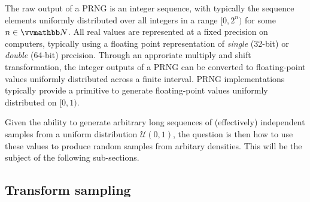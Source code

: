 The raw output of a \ac{PRNG} is an integer sequence, with typically the sequence elements uniformly distributed over all integers in a range $[0, 2^n)$ for some $n \in \naturals$. All real values are represented at a fixed precision on computers, typically using a floating point representation \citep{ieee2008standard} of \emph{single} (32-bit) or \emph{double} (64-bit) precision. Through an approriate multiply and shift transformation, the integer outputs of a \ac{PRNG} can be converted to floating-point values uniformly distributed across a finite interval. \ac{PRNG} implementations typically provide a primitive to generate floating-point values uniformly distributed on $[0, 1)$.

Given the ability to generate arbitrary long sequences of (effectively) independent samples from a uniform distribution $\mathcal{U}(0,1)$, the question is then how to use these values to produce random samples from arbitary densities. This will be the subject of the following sub-sections.

\subsection{Transform sampling}


